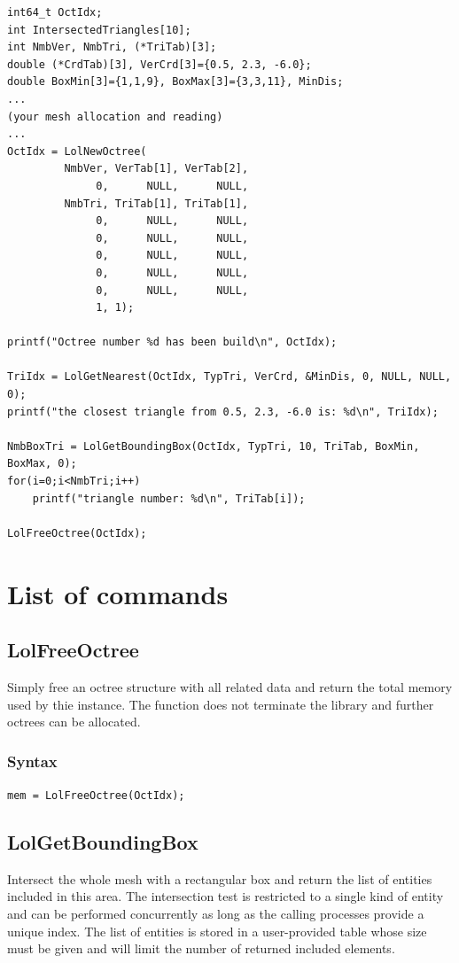 \documentclass[a4paper,12pt]{article}
\begin{document}
\begin{tt}
\begin{verbatim}
int64_t OctIdx;
int IntersectedTriangles[10];
int NmbVer, NmbTri, (*TriTab)[3];
double (*CrdTab)[3], VerCrd[3]={0.5, 2.3, -6.0};
double BoxMin[3]={1,1,9}, BoxMax[3]={3,3,11}, MinDis;
...
(your mesh allocation and reading)
...
OctIdx = LolNewOctree(
         NmbVer, VerTab[1], VerTab[2],
              0,      NULL,      NULL,
         NmbTri, TriTab[1], TriTab[1],
              0,      NULL,      NULL,
              0,      NULL,      NULL,
              0,      NULL,      NULL,
              0,      NULL,      NULL,
              0,      NULL,      NULL,
              1, 1);

printf("Octree number %d has been build\n", OctIdx);

TriIdx = LolGetNearest(OctIdx, TypTri, VerCrd, &MinDis, 0, NULL, NULL, 0);
printf("the closest triangle from 0.5, 2.3, -6.0 is: %d\n", TriIdx);

NmbBoxTri = LolGetBoundingBox(OctIdx, TypTri, 10, TriTab, BoxMin, BoxMax, 0);
for(i=0;i<NmbTri;i++)
    printf("triangle number: %d\n", TriTab[i]);

LolFreeOctree(OctIdx);
\end{verbatim}
\end{tt}
\normalfont


%
%

\clearpage
\section{List of commands}


\subsection{LolFreeOctree}
Simply free an octree structure with all related data and return the total memory used by thie instance.
The function does not terminate the library and further octrees can be allocated.

\subsubsection*{Syntax}
{\tt mem = LolFreeOctree(OctIdx);}


\subsection{LolGetBoundingBox}
Intersect the whole mesh with a rectangular box and return the list of entities included in this area.
The intersection test is restricted to a single kind of entity and can be performed concurrently as long as the calling processes provide a unique index. The list of entities is stored in a user-provided table whose size must be given and will limit the number of returned included elements.
\end{document}
